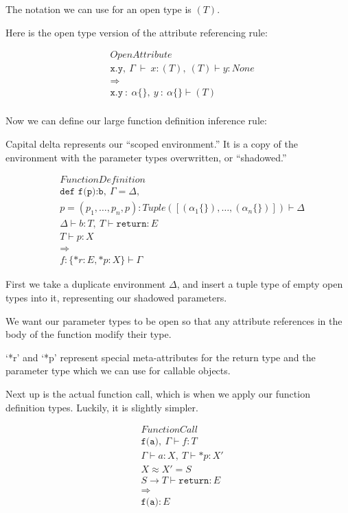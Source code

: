 \documentclass{article}
\begin{document}
The notation we can use for an open type is $(T)$.

Here is the open type version of the attribute referencing rule:

\begin{align*}
&OpenAttribute\\
& \texttt{x.y},\ \Gamma\ \vdash\ x:(T),\ (T) \vdash y:None \\
& \Longrightarrow \\
& \texttt{x.y}\ :\ \alpha\{\},\ y\ :\ \alpha\{\} \vdash (T) \\
\end{align*}

Now we can define our large function definition inference rule:

Capital delta represents our ``scoped environment.'' It is a copy of the environment with the parameter types overwritten, or ``shadowed.''

\begin{align*}
&FunctionDefinition\\
& \texttt{def f(p):b},\ \Gamma = \Delta, \\
& p = (p_1,\dots,p_n, p) : Tuple([(\alpha_1\{\}),\dots,(\alpha_n\{\})]) \vdash \Delta \\
& \Delta \vdash b : T,\ T \vdash \texttt{return}:E \\
& T \vdash p : X \\
& \Longrightarrow \\
& f : \{*r : E, *p : X\} \vdash \Gamma
\end{align*}

First we take a duplicate environment $\Delta$, and insert a tuple type of
empty open types into it, representing our shadowed parameters.

We want our parameter types to be open so that any attribute references in the
body of the function modify their type.

`*r' and `*p' represent special meta-attributes for the return type and the
parameter type which we can use for callable objects.

Next up is the actual function call, which is when we apply our function
definition types. Luckily, it is slightly simpler.

\begin{align*}
&FunctionCall\\
& \texttt{f(a)},\ \Gamma \vdash f : T \\
& \Gamma \vdash a : X,\ T \vdash *p : X' \\
& X \approx X' = S \\
& S \rightarrow T \vdash \texttt{return} : E\\
& \Longrightarrow \\
& \texttt{f(a)} : E
\end{align*}
\end{document}
